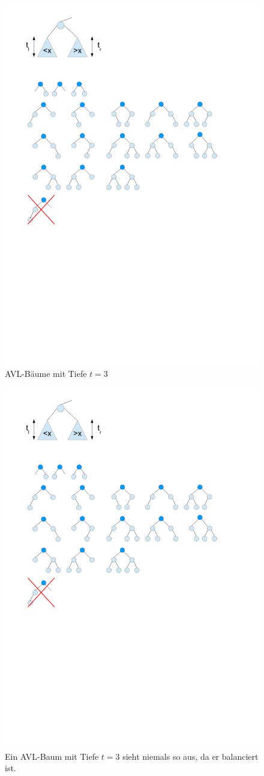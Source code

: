 \documentclass[a4paper,twoside,10pt]{report}
\begin{document}
\begin{figure}[H]\center
\includegraphics[trim= 1cm 14.1cm 3cm 8cm,clip,width=\columnwidth]{figures/avlbase.pdf}
\caption{AVL-Bäume mit Tiefe $t=3$}
\end{figure}
\begin{figure}[H]\center
\includegraphics[trim= 1cm 11cm 16cm 15.5cm,clip,width=.6\columnwidth]{figures/avlbase.pdf}
\caption{Ein AVL-Baum mit Tiefe $t=3$ sieht niemals so aus, da er balanciert ist.}
\end{figure}
\end{document}
